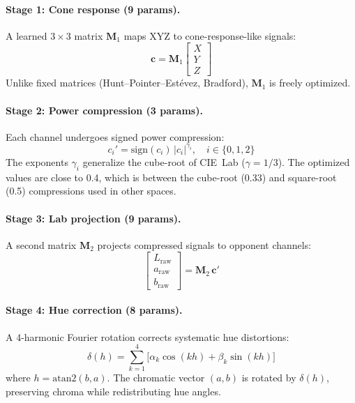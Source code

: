 \documentclass[11pt, twocolumn]{article}
\begin{document}
\paragraph{Stage 1: Cone response (9 params).}
A learned $3\!\times\!3$ matrix $\mathbf{M}_1$ maps XYZ to
cone-response-like signals:
\begin{equation}
  \mathbf{c} = \mathbf{M}_1 \begin{bmatrix} X \\ Y \\ Z \end{bmatrix}
\end{equation}
Unlike fixed matrices (Hunt--Pointer--Est\'evez, Bradford),
$\mathbf{M}_1$ is freely optimized.

\paragraph{Stage 2: Power compression (3 params).}
Each channel undergoes signed power compression:
\begin{equation}
  c_i' = \mathrm{sign}(c_i)\,|c_i|^{\gamma_i}, \quad i \in \{0,1,2\}
\end{equation}
The exponents $\gamma_i$ generalize the cube-root of CIE~Lab
($\gamma = 1/3$). The optimized values are close to 0.4, which is
between the cube-root (0.33) and square-root (0.5) compressions
used in other spaces.

\paragraph{Stage 3: Lab projection (9 params).}
A second matrix $\mathbf{M}_2$ projects compressed signals to
opponent channels:
\begin{equation}
  \begin{bmatrix} L_\mathrm{raw} \\ a_\mathrm{raw} \\ b_\mathrm{raw} \end{bmatrix} = \mathbf{M}_2 \, \mathbf{c}'
\end{equation}

\paragraph{Stage 4: Hue correction (8 params).}
A 4-harmonic Fourier rotation corrects systematic hue distortions:
\begin{equation}
  \delta(h) = \sum_{k=1}^{4}\!\bigl[\alpha_k\cos(kh) + \beta_k\sin(kh)\bigr]
\end{equation}
where $h = \mathrm{atan2}(b, a)$. The chromatic vector $(a,b)$ is
rotated by $\delta(h)$, preserving chroma while redistributing
hue angles.
\end{document}
